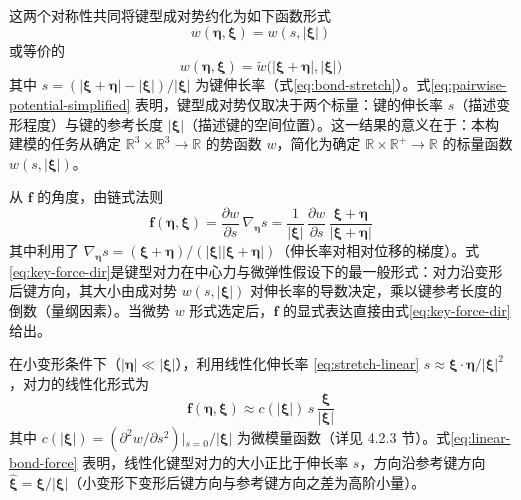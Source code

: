 这两个对称性共同将键型成对势约化为如下函数形式
\begin{equation}
w(\boldsymbol{\eta},\boldsymbol{\xi}) = w(s,|\boldsymbol{\xi}|)
\label{eq:pairwise-potential-simplified}
\end{equation}
或等价的
\begin{equation}
w(\boldsymbol{\eta},\boldsymbol{\xi}) = \tilde{w}\bigl(|\boldsymbol{\xi}+\boldsymbol{\eta}|,|\boldsymbol{\xi}|\bigr)
\label{eq:pairwise-potential-alt}
\end{equation}
其中 $s=(|\boldsymbol{\xi}+\boldsymbol{\eta}|-|\boldsymbol{\xi}|)/|\boldsymbol{\xi}|$ 为键伸长率（式\eqref{eq:bond-stretch}）。式\eqref{eq:pairwise-potential-simplified} 表明，键型成对势仅取决于两个标量：键的伸长率 $s$（描述变形程度）与键的参考长度 $|\boldsymbol{\xi}|$（描述键的空间位置）。这一结果的意义在于：本构建模的任务从确定 $\mathbb{R}^3\times\mathbb{R}^3\to\mathbb{R}$ 的势函数 $w$，简化为确定 $\mathbb{R}\times\mathbb{R}^+\to\mathbb{R}$ 的标量函数 $w(s,|\boldsymbol{\xi}|)$。

从 $\mathbf{f}$ 的角度，由链式法则
\begin{equation}
\mathbf{f}(\boldsymbol{\eta},\boldsymbol{\xi}) = \frac{\partial w}{\partial s}\,\nabla_{\boldsymbol{\eta}} s
= \frac{1}{|\boldsymbol{\xi}|}\,\frac{\partial w}{\partial s}\,
\frac{\boldsymbol{\xi}+\boldsymbol{\eta}}{|\boldsymbol{\xi}+\boldsymbol{\eta}|}
\label{eq:key-force-dir}
\end{equation}
其中利用了 $\nabla_{\boldsymbol{\eta}} s = (\boldsymbol{\xi}+\boldsymbol{\eta})/(|\boldsymbol{\xi}||\boldsymbol{\xi}+\boldsymbol{\eta}|)$（伸长率对相对位移的梯度）。式\eqref{eq:key-force-dir}是键型对力在中心力与微弹性假设下的最一般形式：对力沿变形后键方向，其大小由成对势 $w(s,|\boldsymbol{\xi}|)$ 对伸长率的导数决定，乘以键参考长度的倒数（量纲因素）。当微势 $w$ 形式选定后，$\mathbf{f}$ 的显式表达直接由式\eqref{eq:key-force-dir}给出。

在小变形条件下（$|\boldsymbol{\eta}|\ll|\boldsymbol{\xi}|$），利用线性化伸长率 \eqref{eq:stretch-linear} $s\approx\boldsymbol{\xi}\cdot\boldsymbol{\eta}/|\boldsymbol{\xi}|^{2}$，对力的线性化形式为
\begin{equation}
\mathbf{f}(\boldsymbol{\eta},\boldsymbol{\xi}) \approx c(|\boldsymbol{\xi}|)\,s\,\frac{\boldsymbol{\xi}}{|\boldsymbol{\xi}|}
\label{eq:linear-bond-force}
\end{equation}
其中 $c(|\boldsymbol{\xi}|)=(\partial^{2}w/\partial s^{2})|_{s=0}/|\boldsymbol{\xi}|$ 为微模量函数（详见 4.2.3 节）。式\eqref{eq:linear-bond-force} 表明，线性化键型对力的大小正比于伸长率 $s$，方向沿参考键方向 $\hat{\boldsymbol{\xi}}=\boldsymbol{\xi}/|\boldsymbol{\xi}|$（小变形下变形后键方向与参考键方向之差为高阶小量）。

